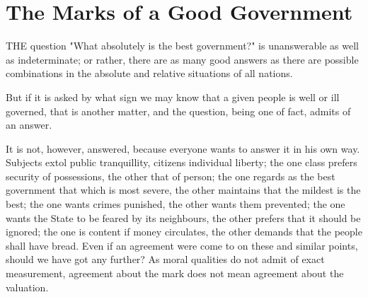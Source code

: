 \documentclass[12pt]{book}
\begin{document}
\section{The Marks of a Good Government}
THE question "What absolutely is the best government?" is unanswerable as well as indeterminate; or rather, there are as many good answers as there are possible combinations in the absolute and relative situations of all nations.

But if it is asked by what sign we may know that a given people is well or ill governed, that is another matter, and the question, being one of fact, admits of an answer.

It is not, however, answered, because everyone wants to answer it in his own way. Subjects extol public tranquillity, citizens individual liberty; the one class prefers security of possessions, the other that of person; the one regards as the best government that which is most severe, the other maintains that the mildest is the best; the one wants crimes punished, the other wants them prevented; the one wants the State to be feared by its neighbours, the other prefers that it should be ignored; the one is content if money circulates, the other demands that the people shall have bread. Even if an agreement were come to on these and similar points, should we have got any further? As moral qualities do not admit of exact measurement, agreement about the mark does not mean agreement about the valuation.
\end{document}
